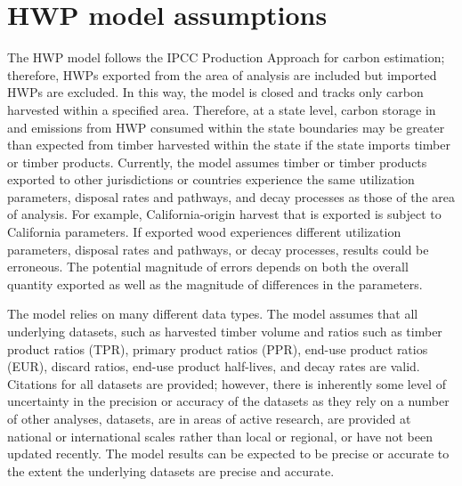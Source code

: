 \documentclass[
  openany]{book}
\begin{document}
\hypertarget{int-assump}{%
\section{HWP model assumptions}\label{int-assump}}

The HWP model follows the IPCC Production Approach for carbon estimation; therefore, HWPs exported from the area of analysis are included but imported HWPs are excluded. In this way, the model is closed and tracks only carbon harvested within a specified area. Therefore, at a state level, carbon storage in and emissions from HWP consumed within the state boundaries may be greater than expected from timber harvested within the state if the state imports timber or timber products. Currently, the model assumes timber or timber products exported to other jurisdictions or countries experience the same utilization parameters, disposal rates and pathways, and decay processes as those of the area of analysis. For example, California-origin harvest that is exported is subject to California parameters. If exported wood experiences different utilization parameters, disposal rates and pathways, or decay processes, results could be erroneous. The potential magnitude of errors depends on both the overall quantity exported as well as the magnitude of differences in the parameters.

The model relies on many different data types. The model assumes that all underlying datasets, such as harvested timber volume and ratios such as timber product ratios (TPR), primary product ratios (PPR), end-use product ratios (EUR), discard ratios, end-use product half-lives, and decay rates are valid. Citations for all datasets are provided; however, there is inherently some level of uncertainty in the precision or accuracy of the datasets as they rely on a number of other analyses, datasets, are in areas of active research, are provided at national or international scales rather than local or regional, or have not been updated recently. The model results can be expected to be precise or accurate to the extent the underlying datasets are precise and accurate.
\end{document}

